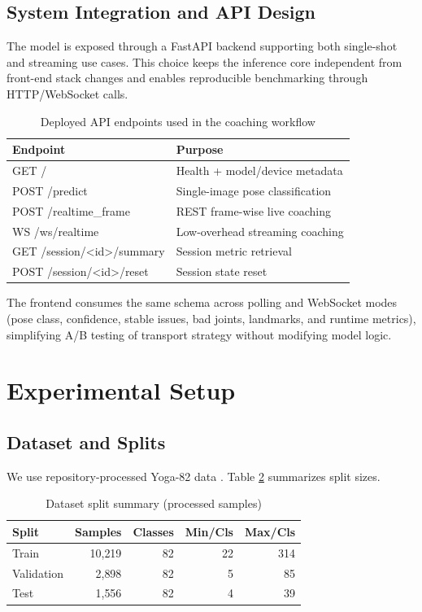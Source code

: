 \documentclass[conference]{IEEEtran}
\begin{document}
\subsection{System Integration and API Design}
The model is exposed through a FastAPI backend supporting both single-shot and streaming use cases. This choice keeps the inference core independent from front-end stack changes and enables reproducible benchmarking through HTTP/WebSocket calls.

\begin{table}[t]
\caption{Deployed API endpoints used in the coaching workflow}
\label{tab:api_endpoints}
\centering
\begin{tabular}{ll}
\toprule
Endpoint & Purpose \\
\midrule
GET / & Health + model/device metadata \\
POST /predict & Single-image pose classification \\
POST /realtime\_frame & REST frame-wise live coaching \\
WS /ws/realtime & Low-overhead streaming coaching \\
GET /session/<id>/summary & Session metric retrieval \\
POST /session/<id>/reset & Session state reset \\
\bottomrule
\end{tabular}
\end{table}

The frontend consumes the same schema across polling and WebSocket modes (pose class, confidence, stable issues, bad joints, landmarks, and runtime metrics), simplifying A/B testing of transport strategy without modifying model logic.

\section{Experimental Setup}
\subsection{Dataset and Splits}
We use repository-processed Yoga-82 data \cite{verma2020yoga82}. Table \ref{tab:splits} summarizes split sizes.

\begin{table}[t]
\caption{Dataset split summary (processed samples)}
\label{tab:splits}
\centering
\begin{tabular}{lrrrr}
\toprule
Split & Samples & Classes & Min/Cls & Max/Cls \\
\midrule
Train & 10{,}219 & 82 & 22 & 314 \\
Validation & 2{,}898 & 82 & 5 & 85 \\
Test & 1{,}556 & 82 & 4 & 39 \\
\bottomrule
\end{tabular}
\end{table}
\end{document}
